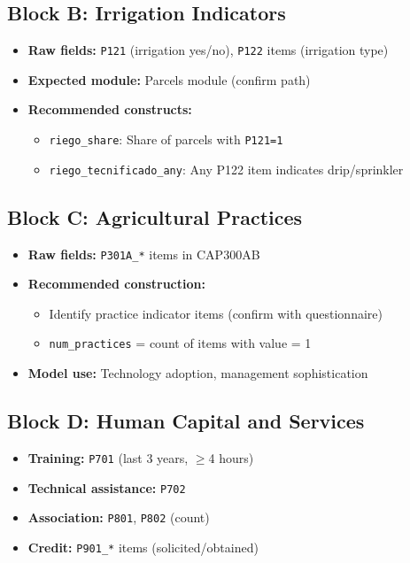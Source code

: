 \documentclass[11pt,a4paper]{article}
\begin{document}
\subsection{Block B: Irrigation Indicators}

\begin{itemize}[leftmargin=1.5em]
    \item \textbf{Raw fields:} \texttt{P121} (irrigation yes/no), \texttt{P122} items (irrigation type)
    \item \textbf{Expected module:} Parcels module (confirm path)
    \item \textbf{Recommended constructs:}
    \begin{itemize}
        \item \texttt{riego\_share}: Share of parcels with \texttt{P121=1}
        \item \texttt{riego\_tecnificado\_any}: Any P122 item indicates drip/sprinkler
    \end{itemize}
\end{itemize}

\subsection{Block C: Agricultural Practices}

\begin{itemize}[leftmargin=1.5em]
    \item \textbf{Raw fields:} \texttt{P301A\_*} items in CAP300AB
    \item \textbf{Recommended construction:}
    \begin{itemize}
        \item Identify practice indicator items (confirm with questionnaire)
        \item \texttt{num\_practices} = count of items with value = 1
    \end{itemize}
    \item \textbf{Model use:} Technology adoption, management sophistication
\end{itemize}

\subsection{Block D: Human Capital and Services}

\begin{itemize}[leftmargin=1.5em]
    \item \textbf{Training:} \texttt{P701} (last 3 years, $\geq$4 hours)
    \item \textbf{Technical assistance:} \texttt{P702}
    \item \textbf{Association:} \texttt{P801}, \texttt{P802} (count)
    \item \textbf{Credit:} \texttt{P901\_*} items (solicited/obtained)
\end{itemize}
\end{document}
